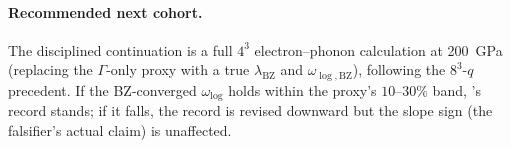 \paragraph{Recommended next cohort.}
The disciplined continuation is a full $4^3$ electron--phonon calculation at
\SI{200}{\giga\pascal} (replacing the $\Gamma$-only proxy with a true
$\lambda_{\mathrm{BZ}}$ and $\omega_{\log,\mathrm{BZ}}$), following the
 $8^3$-$q$ precedent. If the BZ-converged $\omega_{\log}$ holds
within the proxy's $10$--$30\%$ band, 's record stands; if it falls,
the record is revised downward but the slope sign (the falsifier's actual
claim) is unaffected.
